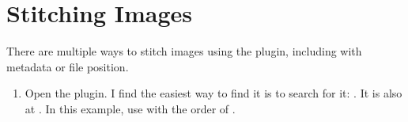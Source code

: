 \documentclass[letterpaper,10pt,english]{jupyterBook}
\begin{document}
\section{Stitching Images}
\label{\detokenize{basic-registration:stitching-images}}
\sphinxAtStartPar
There are multiple ways to stitch images using the  plugin, including with metadata or file position.
\begin{enumerate}
%
\item {} 
\sphinxAtStartPar
Open the  plugin. I find the easiest way to find it is to search for it: .
It is also at .
In this example, use  with the order of .

\end{enumerate}
\end{document}
